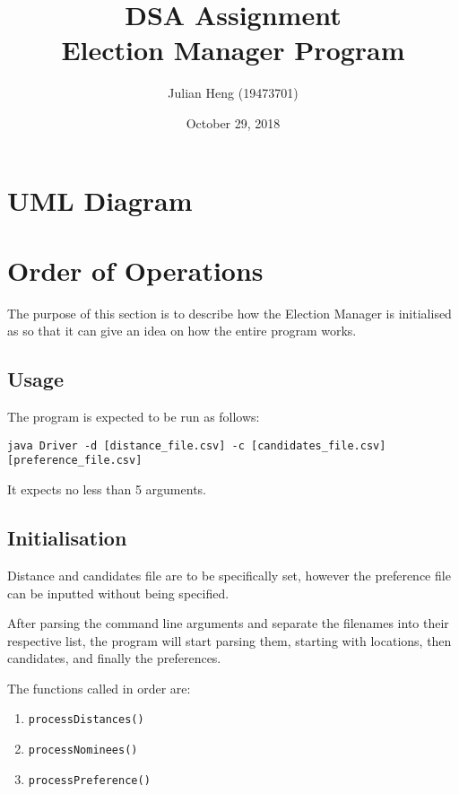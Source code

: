 \documentclass[a4paper, 12pt, titlepage]{article}
\title{\huge \textbf{DSA Assignment\\Election Manager Program}}
\author{Julian Heng (19473701)}
\date{October 29, 2018}
\newcommand{\code}[1]{\small\texttt{#1}\normalsize}
\begin{document}
\maketitle
\tableofcontents
\newpage

\pagestyle{fancy}

\fancyhf[FC]{\thepage}

\section{UML Diagram}

\newpage

\section{Order of Operations}

The purpose of this section is to describe how the Election Manager is
initialised as so that it can give an idea on how the entire program works.

\subsection{Usage}
The program is expected to be run as follows:

\code{java Driver -d [distance\_file.csv]
-c [candidates\_file.csv] [preference\_file.csv]}

It expects no less than 5 arguments.

\subsection{Initialisation}
Distance and candidates file are to be specifically set, however the
preference file can be inputted without being specified.

After parsing the command line arguments and separate the filenames
into their respective list, the program will start parsing them, starting
with locations, then candidates, and finally the preferences.

The functions called in order are:
\begin{enumerate}
    \item \code{processDistances()}
    \item \code{processNominees()}
    \item \code{processPreference()}
\end{enumerate}
\end{document}
